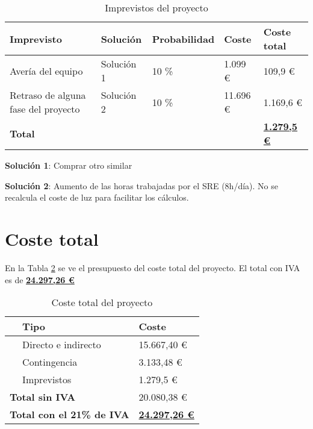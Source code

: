 \begin{table}[H]\label{tab:imprevistos}
	\centering
	\begin{tabular}{|l|l|l|l|l|}
		\hline
		Imprevisto                           & Solución   & Probabilidad     & Coste    & Coste total \\ \hline
		Avería del equipo                    & Solución 1 & 10 \%            & 1.099 €  & 109,9 €     \\ \hline
		Retraso de alguna fase del proyecto  & Solución 2 & 10 \%            & 11.696 € & 1.169,6 €   \\ \hline
		\multicolumn{4}{|l|}{\textbf{Total}} & \textbf{\underline{1.279,5 €}}                         \\ \hline
		                                                                        
	\end{tabular}
	\caption{Imprevistos del proyecto}
\end{table}

\textbf{Solución 1}: Comprar otro similar

\textbf{Solución 2}: Aumento de las horas trabajadas por el SRE (8h/día). No se recalcula el coste de luz para facilitar los cálculos.

\section{Coste total}

En la Tabla \ref{tab:totaltotal} se ve el presupuesto del coste total del proyecto. El total con IVA es de \textbf{\underline{24.297,26 €}}

\begin{table}[H]\label{tab:totaltotal}
	\centering
	\begin{tabular}{|l|l|l|}
		\hline
		\multirow{4}{*}{}    & \textbf{Tipo}                 & \textbf{Coste}       \\ \hline
		& Directo e indirecto   & 15.667,40 € \\ \hline
		& Contingencia          & 3.133,48 €  \\ \hline
		& Imprevistos           & 1.279,5 €   \\ \hline
		\multicolumn{2}{|l|}{\textbf{Total sin IVA}}            & 20.080,38 € \\ \hline
		\multicolumn{2}{|l|}{\textbf{Total con el 21\% de IVA}} & \textbf{\underline{24.297,26 €}} \\ \hline
	\end{tabular}
    \caption{Coste total del proyecto}
\end{table}




